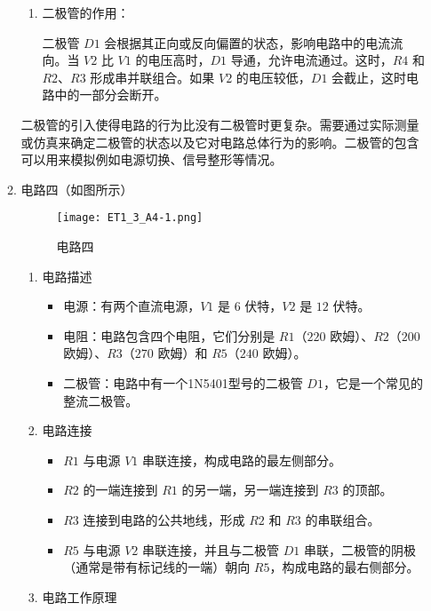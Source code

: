 \documentclass[dvipsnames, svgnames,a4paper,11pt]{article}
\begin{document}
\begin{enumerate}
\begin{enumerate}
\begin{enumerate}
				\item 二极管的作用：
				
				二极管 $D1$ 会根据其正向或反向偏置的状态，影响电路中的电流流向。当 $V2$ 比 $V1$ 的电压高时，$D1$ 导通，允许电流通过。这时，$R4$ 和 $R2$、$R3$ 形成串并联组合。如果 $V2$ 的电压较低，$D1$ 会截止，这时电路中的一部分会断开。
			\end{enumerate}
			
			二极管的引入使得电路的行为比没有二极管时更复杂。需要通过实际测量或仿真来确定二极管的状态以及它对电路总体行为的影响。二极管的包含可以用来模拟例如电源切换、信号整形等情况。
			
			\item 电路四（如图所示）
			
			\begin{figure}[htbp]
				\centering
				\texttt{[image: ET1\_3\_A4-1.png]}
				\caption{电路四}
				\label{fig:fig4-1}
			\end{figure}
			
			\begin{enumerate}
				\item 电路描述
				
				\begin{itemize}
					\item 电源：有两个直流电源，$V1$ 是 $6$ 伏特，$V2$ 是 $12$ 伏特。
					\item 电阻：电路包含四个电阻，它们分别是 $R1$（$220$ 欧姆）、$R2$（$200$ 欧姆）、$R3$（$270$ 欧姆）和 $R5$（$240$ 欧姆）。
					\item 二极管：电路中有一个1N5401型号的二极管 $D1$，它是一个常见的整流二极管。
				\end{itemize}
				
				\item 电路连接
				
				\begin{itemize}
					\item $R1$ 与电源 $V1$ 串联连接，构成电路的最左侧部分。
					\item $R2$ 的一端连接到 $R1$ 的另一端，另一端连接到 $R3$ 的顶部。
					\item $R3$ 连接到电路的公共地线，形成 $R2$ 和 $R3$ 的串联组合。
					\item $R5$ 与电源 $V2$ 串联连接，并且与二极管 $D1$ 串联，二极管的阴极（通常是带有标记线的一端）朝向 $R5$，构成电路的最右侧部分。
				\end{itemize}
				
				\item 电路工作原理
				

\end{enumerate}
\end{enumerate}
\end{enumerate}
\end{document}
